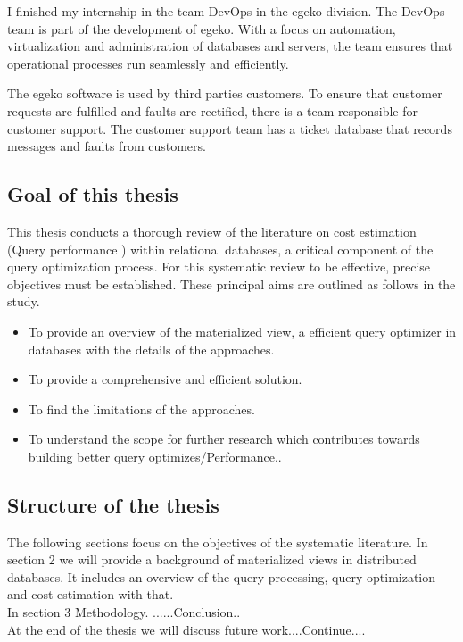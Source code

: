 I finished my internship in the team DevOps  in the egeko division. The DevOps team is part of the development of egeko. With a focus on automation, virtualization and administration of databases and servers, the team ensures that operational processes run seamlessly and efficiently. 

The egeko software is used by third parties  customers. To ensure that customer requests are fulfilled and faults are rectified, there is a team responsible for customer support. The customer support team has a ticket database that records messages and faults from customers.\\

\subsection{Goal of this thesis}
\normalsize
This thesis conducts a thorough review of the literature on cost estimation (Query performance ) within relational databases, a critical component of the query optimization process. For this systematic review to be effective, precise objectives must be established. These principal aims are outlined as follows in the study.\cite{CostEstimation}
\begin{itemize}
  \item To provide an overview of the materialized view, a efficient  query optimizer in databases with the details of the approaches.
  \item To provide a comprehensive and efficient solution.
  \item To find the limitations of the approaches.
  \item To understand the scope for further research which contributes towards building
better query optimizes/Performance..\cite{CostEstimation}
\end{itemize}
\subsection{Structure of the thesis }The following sections  focus on the objectives of the systematic literature. In section 2 we will provide a background of materialized views  in distributed databases. It includes an overview of the query processing, query optimization and cost estimation with that.\\
In section 3  Methodology. ......Conclusion..\\
At the end of the thesis we  will discuss  future work....Continue....









